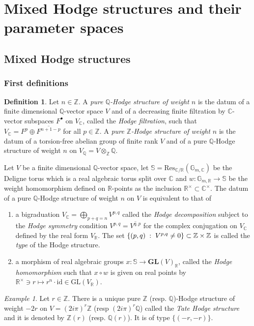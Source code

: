 \documentclass[10pt]{article}
\numberwithin{equation}{subsection}
\theoremstyle{plain}
\theoremstyle{definition}
\newtheorem{definition}[theorem]{Definition}
\theoremstyle{remark}
\newtheorem{example}[theorem]{Example}
\newcommand{\Z}{\mathbb Z}
\newcommand{\Q}{\mathbb Q}
\newcommand{\C}{\mathbb C}
\newcommand{\R}{\mathbb R}
\newcommand{\s}{\mathbb S}
\newcommand{\mult}{\mathbb G}
\newcommand{\bul}{\bullet}
\newcommand{\gl}{\mathbf{GL}}
\newcommand{\res}{\mathrm{Res}}
\begin{document}
\section{Mixed Hodge structures and their parameter spaces}\label{sect2}
\subsection{Mixed Hodge structures}
\subsubsection*{First definitions}
\begin{definition}
Let $n \in \Z$. A \textit{pure $\Q$-Hodge structure of weight $n$} is the datum of a finite dimensional $\Q$-vector space $V$ and of a decreasing finite filtration by $\C$-vector subspaces $F^\bul$ on $V_\C$, called the \textit{Hodge filtration}, such that $V_\C = F^p \oplus \overline{F^{n+1-p}}$ for all $p\in \Z$. A \textit{pure $\Z$-Hodge structure of weight $n$} is the datum of a torsion-free abelian group of finite rank $V$ and of a pure $\Q$-Hodge structure of weight $n$ on $V_\Q = V \otimes_\Z \Q$.
\end{definition}
Let $V$ be a finite dimensional $\Q$-vector space, let $\s = \res_{\C/\R}(\mult_{m,\C})$ be the Deligne torus which is a real algebraic torus split over $\C$ and $w : \mult_{m,\R} \rightarrow \s$ be the weight homomorphism defined on $\R$-points as the inclusion $\R^\times \subset \C^\times$. The datum of a pure $\Q$-Hodge structure of weight $n$ on $V$ is equivalent to that of
\begin{enumerate}
\item a bigraduation $V_\C = \bigoplus_{p+q = n} V^{p,q}$ called the \textit{Hodge decomposition} subject to the \textit{Hodge symmetry} condition $V^{p,q} = \overline{V^{q,p}}$ for the complex conjugation on $V_\C$ defined by the real form $V_\R$. The set $\{(p,q) \hspace{0.1cm} : \hspace{0.1cm} V^{p,q} \neq 0\} \subset \Z \times \Z$ is called the \textit{type} of the Hodge structure.
\item a morphism of real algebraic groups $x : \s \rightarrow \gl(V)_\R$, called the \textit{Hodge homomorphism} such that $x \circ w$ is given on real points by $\R^\times \ni r \mapsto r^n \cdot \mathrm{id}\in \mathrm{GL}(V_\R)$.
\end{enumerate}
\begin{example}
Let $r \in \Z$. There is a unique pure $\Z$ (resp. $\Q$)-Hodge structure of weight $-2r$ on $V = (2i\pi)^r\Z$ (resp $(2i\pi)^r\Q$) called the \textit{Tate Hodge structure} and it is denoted by $\Z(r)$ (resp. $\Q(r)$). It is of type $\{(-r,-r)\}$.
\end{example}
\end{document}
